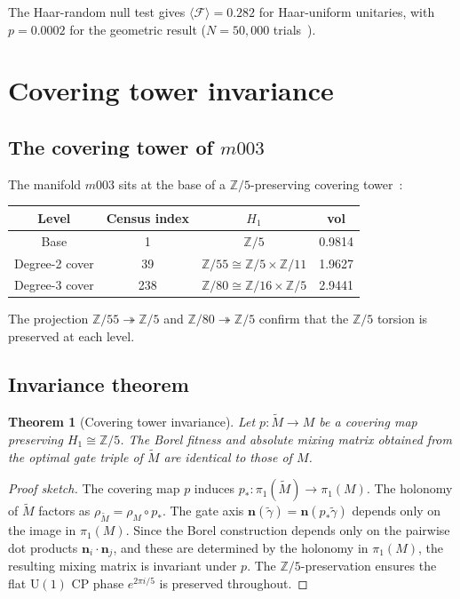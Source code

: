 \documentclass[12pt]{article}
\newtheorem{theorem}{Theorem}
\theoremstyle{definition}
\begin{document}
The Haar-random null test gives $\langle\mathcal{F}\rangle = 0.282$
for Haar-uniform unitaries, with $p = 0.0002$ for the geometric
result ($N = 50{,}000$ trials~\cite{Gentry:PMNS}).

\section{Covering tower invariance}
\label{sec:covering}

\subsection{The covering tower of $m003$}

The manifold $m003$ sits at the base of a $\mathbb{Z}/5$-preserving
covering tower~\cite{Gentry:CKM}:

\begin{center}
\begin{tabular}{cccc}
\toprule
Level & Census index & $H_1$ & vol \\
\midrule
Base & 1 & $\mathbb{Z}/5$ & 0.9814 \\
Degree-2 cover & 39 & $\mathbb{Z}/55 \cong \mathbb{Z}/5 \times
  \mathbb{Z}/11$ & 1.9627 \\
Degree-3 cover & 238 & $\mathbb{Z}/80 \cong \mathbb{Z}/16 \times
  \mathbb{Z}/5$ & 2.9441 \\
\bottomrule
\end{tabular}
\end{center}

The projection $\mathbb{Z}/55 \twoheadrightarrow \mathbb{Z}/5$
and $\mathbb{Z}/80 \twoheadrightarrow \mathbb{Z}/5$ confirm that
the $\mathbb{Z}/5$ torsion is preserved at each level.

\subsection{Invariance theorem}

\begin{theorem}[Covering tower invariance]
\label{thm:invariance}
Let $p: \tilde{M} \to M$ be a covering map preserving
$H_1 \cong \mathbb{Z}/5$. The Borel fitness and absolute mixing
matrix obtained from the optimal gate triple of $\tilde{M}$ are
identical to those of $M$.
\end{theorem}

\begin{proof}[Proof sketch]
The covering map $p$ induces $p_*: \pi_1(\tilde{M}) \to \pi_1(M)$.
The holonomy of $\tilde{M}$ factors as
$\rho_{\tilde{M}} = \rho_M \circ p_*$.
The gate axis $\mathbf{n}(\tilde\gamma) = \mathbf{n}(p_*\tilde\gamma)$
depends only on the image in $\pi_1(M)$.
Since the Borel construction depends only on the pairwise dot
products $\mathbf{n}_i \cdot \mathbf{n}_j$, and these are
determined by the holonomy in $\pi_1(M)$, the resulting mixing
matrix is invariant under $p$.
The $\mathbb{Z}/5$-preservation ensures the flat $\mathrm{U}(1)$
CP phase $e^{2\pi i/5}$ is preserved throughout.
\end{proof}
\end{document}
